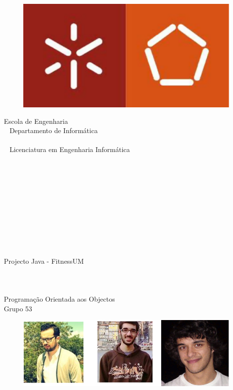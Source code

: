 \documentclass[12pt,notitlepage]{article}
\begin{document}
\begin{titlepage}
\begin{figure}
\centering
\includegraphics[scale=0.5]{logo.pdf}
\end{figure}



\begin{center}

Escola de Engenharia \\~  Departamento de Informática \\~ \\~ Licenciatura em Engenharia Informática \\~ \\~ \\~  \\~ \\~ \\~ \\~ \\~ \\~ \\~


{\Huge Projecto Java - FitnessUM }
\\~ \\~ \\~ \\
Programação Orientada aos Objectos
  \vfill
  ~\\ Grupo 53

\begin{figure}[h]
\centering

\end{figure}

\begin{figure}[h]
\centering
\includegraphics[scale=0.6]{autores.png}
\end{figure}


\end{center}
\end{titlepage}
\end{document}
